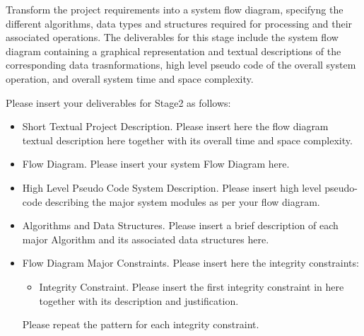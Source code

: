 \textnormal{
Transform the project requirements into a system flow diagram, specifyng the different algorithms, data types and structures required for processing and their associated operations.  
The deliverables for this stage include the system flow diagram containing a graphical representation and  textual descriptions of the corresponding data trasnformations, high level pseudo code of the overall system operation, and overall system time and space complexity.}


Please insert your deliverables for Stage2 as follows:
\begin{itemize} 
\item{  Short Textual Project Description. }
Please insert here the flow diagram textual description here together with its overall time and space complexity.
\item{ Flow Diagram. }
Please insert your system Flow Diagram here.
\item{ High Level Pseudo Code System Description. }
Please insert high level pseudo-code describing the major system modules as per your flow diagram.
\item{Algorithms and  Data Structures. }
Please insert a brief description of each major Algorithm and its associated data structures here.
\end{itemize}

\begin{itemize} 
\item{  Flow Diagram Major Constraints.}
Please insert here the integrity constraints:
\begin{itemize} 
\item{ Integrity Constraint. }
Please insert the first integrity constraint in here together with its description and justification. 
\end{itemize}
Please repeat the pattern for each integrity constraint.
\end{itemize}


